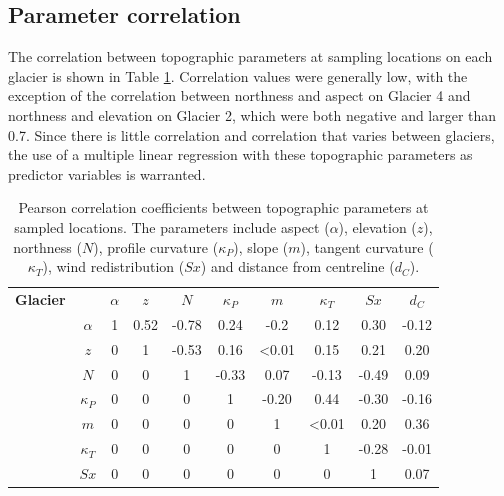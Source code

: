 \documentclass[12pt]{article}
\begin{document}
\subsection{Parameter correlation}

The correlation between topographic parameters at sampling locations on each glacier is shown in Table \ref{tab:pearson_correlation}. Correlation values were generally low, with the exception of the correlation between northness and aspect on Glacier 4 and northness and elevation on Glacier 2, which were both negative and larger than 0.7. Since there is little correlation and correlation that varies between glaciers, the use of a multiple linear regression with these topographic parameters as predictor variables is warranted. 

\begin{table}[]
\centering
\caption{Pearson correlation coefficients between topographic parameters at sampled locations. The parameters include aspect ($\alpha$), elevation ($z$), northness ($N$), profile curvature ($\kappa_P$), slope ($m$), tangent curvature ($\kappa_T$), wind redistribution ($Sx$) and distance from centreline ($d_C$).}
\label{tab:pearson_correlation}
\begin{tabular}{cccccccccc}
\textbf{Glacier} &  & \textbf{$\alpha$} & \textbf{$z$} & \textbf{$N$} & \textbf{$\kappa_P$} & \textbf{$m$} & \textbf{$\kappa_T$} & \textbf{$Sx$} & \textbf{$d_C$} \\
\rowcolor[HTML]{EFEFEF} 
\cellcolor[HTML]{EFEFEF} & \textbf{$\alpha$} & 1 & 0.52 & -0.78 & 0.24 & -0.2 & 0.12 & 0.30 & -0.12 \\
\rowcolor[HTML]{EFEFEF} 
\cellcolor[HTML]{EFEFEF} & \textbf{$z$} & 0 & 1 & -0.53 & 0.16 & \textless 0.01 & 0.15 & 0.21 & 0.20 \\
\rowcolor[HTML]{EFEFEF} 
\cellcolor[HTML]{EFEFEF} & \textbf{$N$} & 0 & 0 & 1 & -0.33 & 0.07 & -0.13 & -0.49 & 0.09 \\
\rowcolor[HTML]{EFEFEF} 
\cellcolor[HTML]{EFEFEF} & \textbf{$\kappa_P$} & 0 & 0 & 0 & 1 & -0.20 & 0.44 & -0.30 & -0.16 \\
\rowcolor[HTML]{EFEFEF} 
\cellcolor[HTML]{EFEFEF} & \textbf{$m$} & 0 & 0 & 0 & 0 & 1 & \textless 0.01 & 0.20 & 0.36 \\
\rowcolor[HTML]{EFEFEF} 
\cellcolor[HTML]{EFEFEF} & \textbf{$\kappa_T$} & 0 & 0 & 0 & 0 & 0 & 1 & -0.28 & -0.01 \\
\rowcolor[HTML]{EFEFEF} 
\cellcolor[HTML]{EFEFEF} & \textbf{$Sx$} & 0 & 0 & 0 & 0 & 0 & 0 & 1 & 0.07 \\

\end{tabular}
\end{table}
\end{document}
